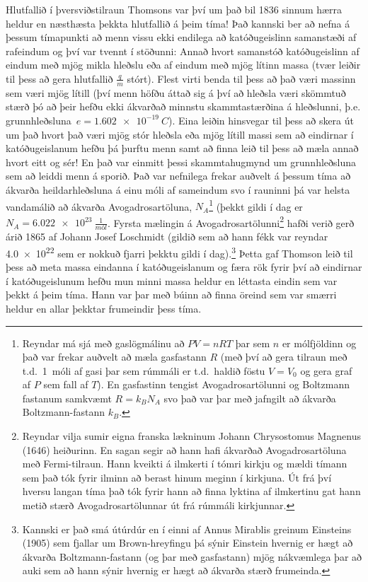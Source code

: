 \ifdefined \wholebook \else\documentclass[oneside]{book}\usepackage{EdlBook}\graphicspath{{figures/}}
\begin{document}
Hlutfallið í þversviðstilraun Thomsons var því um það bil 1836 sinnum hærra heldur en næsthæsta þekkta hlutfallið á þeim tíma! Það kannski ber að nefna á þessum tímapunkti að menn vissu ekki endilega að katóðugeislinn samanstæði af rafeindum og því var tvennt í stöðunni: Annað hvort samanstóð katóðugeislinn af eindum með mjög mikla hleðslu eða af eindum með mjög lítinn massa (tvær leiðir til þess að gera hlutfallið $\frac{q}{m}$ stórt). Flest virti benda til þess að það væri massinn sem væri mjög lítill (því menn höfðu áttað sig á því að hleðsla væri skömmtuð stærð þó að þeir hefðu ekki ákvarðað minnstu skammtastærðina á hleðslunni, þ.e. grunnhleðsluna~$e = \SI{1.602e-19}{C}$). Eina leiðin hinsvegar til þess að skera út um það hvort það væri mjög stór hleðsla eða mjög lítill massi sem að eindirnar í katóðugeislanum hefðu þá þurftu menn samt að finna leið til þess að mæla annað hvort eitt og sér! En það var einmitt þessi skammtahugmynd um grunnhleðsluna sem að leiddi menn á sporið. Það var nefnilega frekar auðvelt á þessum tíma að ákvarða heildarhleðsluna á einu móli af sameindum svo í rauninni þá var helsta vandamálið að ákvarða Avogadrosartöluna, $N_A$\footnote{Reyndar má sjá með gaslögmálinu að $PV = nRT$ þar sem $n$ er mólfjöldinn og það var frekar auðvelt að mæla gasfastann $R$ (með því að gera tilraun með t.d.~\SI{1}{móli} af gasi þar sem rúmmáli er t.d.~haldið föstu $V = V_0$ og gera graf af $P$ sem fall af $T$). En gasfastinn tengist Avogadrosartölunni og Boltzmann fastanum samkvæmt $R = k_B N_A$ svo það var þar með jafngilt að ákvarða Boltzmann-fastann $k_B$.} (þekkt gildi í dag er $N_A = \SI[per-mode=fraction]{6.022e23}{\frac{1}{mól}}$. Fyrsta mælingin á Avogadrosartölunni\footnote{Reyndar vilja sumir eigna franska lækninum Johann Chrysostomus Magnenus (1646) heiðurinn. En sagan segir að hann hafi ákvarðað Avogadrosartöluna með Fermi-tilraun. Hann kveikti á ilmkerti í tómri kirkju og mældi tímann sem það tók fyrir ilminn að berast hinum meginn í kirkjuna. Út frá því hversu langan tíma það tók fyrir hann að finna lyktina af ilmkertinu gat hann metið stærð Avogadrosartölunnar út frá rúmmáli kirkjunnar.} hafði verið gerð árið 1865 af Johann Josef Loschmidt (gildið sem að hann fékk var reyndar \SI{4.0e22}{} sem er nokkuð fjarri þekktu gildi í dag).\footnote{Kannski er það smá útúrdúr en í einni af Annus Mirablis greinum Einsteins (1905) sem fjallar um Brown-hreyfingu þá sýnir Einstein hvernig er hægt að ákvarða Boltzmann-fastann (og þar með gasfastann) mjög nákvæmlega þar að auki sem að hann sýnir hvernig er hægt að ákvarða stærð frumeinda.} Þetta gaf Thomson leið til þess að meta massa eindanna í katóðugeislanum og færa rök fyrir því að eindirnar í katóðugeislunum hefðu mun minni massa heldur en léttasta eindin sem var þekkt á þeim tíma. Hann var þar með búinn að finna öreind sem var smærri heldur en allar þekktar frumeindir þess tíma. \\
\end{document}
